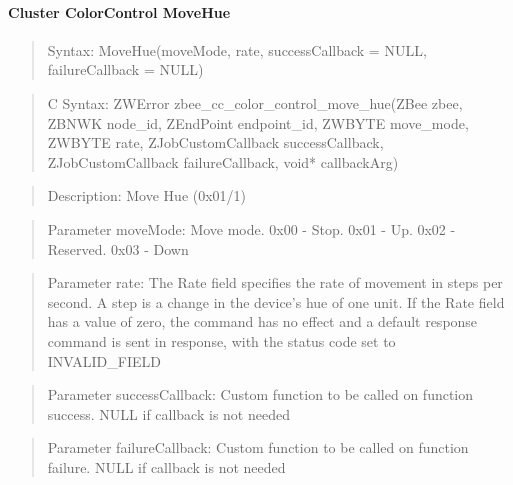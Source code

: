 \paragraph{Cluster ColorControl MoveHue}
\begin{quote}Syntax: MoveHue(moveMode, rate, successCallback = NULL, failureCallback = NULL)\end{quote}
\begin{quote}C Syntax: ZWError zbee\_cc\_color\_control\_move\_hue(ZBee zbee, ZBNWK node\_id, ZEndPoint endpoint\_id, ZWBYTE move\_mode, ZWBYTE rate, ZJobCustomCallback successCallback, ZJobCustomCallback failureCallback, void* callbackArg)\end{quote}
\begin{quote}Description: Move Hue (0x01/1)\end{quote}
\begin{quote}Parameter moveMode: Move mode. 0x00 - Stop. 0x01 - Up. 0x02 - Reserved. 0x03 - Down\end{quote}
\begin{quote}Parameter rate: The Rate field specifies the rate of movement in steps per second. A step is a change in the device’s hue of one unit. If the Rate field has a value of zero, the command has no effect and a default response command is sent in response, with the status code set to INVALID\_FIELD\end{quote}
\begin{quote}Parameter successCallback: Custom function to be called on function success. NULL if callback is not needed\end{quote}
\begin{quote}Parameter failureCallback: Custom function to be called on function failure. NULL if callback is not needed\end{quote}


